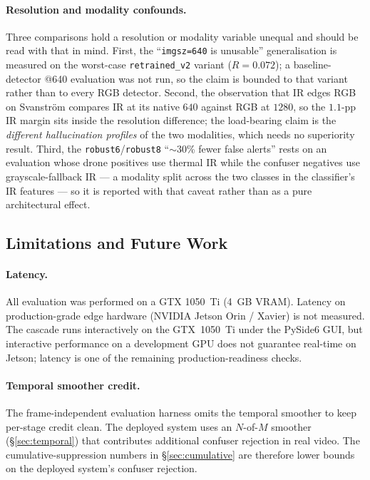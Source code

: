 \paragraph{Resolution and modality confounds.}
Three comparisons hold a resolution or modality variable unequal and should be read with that in mind. First, the ``\texttt{imgsz=640} is unusable'' generalisation is measured on the worst-case \texttt{retrained\_v2} variant ($R=0.072$); a baseline-detector @640 evaluation was not run, so the claim is bounded to that variant rather than to every RGB detector. Second, the observation that IR edges RGB on Svanstr\"om compares IR at its native $640$ against RGB at $1280$, so the $1.1$-pp IR margin sits inside the resolution difference; the load-bearing claim is the \emph{different hallucination profiles} of the two modalities, which needs no superiority result. Third, the \texttt{robust6}/\texttt{robust8} ``$\sim$30\% fewer false alerts'' rests on an evaluation whose drone positives use thermal IR while the confuser negatives use grayscale-fallback IR --- a modality split across the two classes in the classifier's IR features --- so it is reported with that caveat rather than as a pure architectural effect.

\subsection{Limitations and Future Work}
\label{sec:limits}

\paragraph{Latency.}
All evaluation was performed on a GTX 1050~Ti (4~GB VRAM). Latency on production-grade edge hardware (NVIDIA Jetson Orin / Xavier) is not measured. The cascade runs interactively on the GTX~1050~Ti under the PySide6 GUI, but interactive performance on a development GPU does not guarantee real-time on Jetson; latency is one of the remaining production-readiness checks.

\paragraph{Temporal smoother credit.}
The frame-independent evaluation harness omits the temporal smoother to keep per-stage credit clean. The deployed system uses an $N$-of-$M$ smoother (\S\ref{sec:temporal}) that contributes additional confuser rejection in real video. The cumulative-suppression numbers in \S\ref{sec:cumulative} are therefore lower bounds on the deployed system's confuser rejection.

